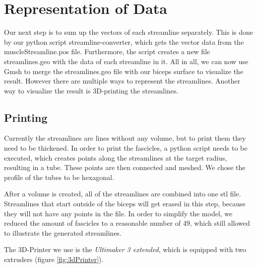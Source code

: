 \documentclass[preprint,journal]{vgtc}       %
\begin{document}
\section{Representation of Data}
Our next step is to sum up the vectors of each streamline separately. 
This is done by our python script streamline-converter, which gets the vector data from the muscleStreamline.pos file. 
Furthermore, the script creates a new file streamlines.geo with the data of each streamline in it. 
All in all, we can now use Gmsh to merge the streamlines.geo file with our biceps surface to visualize the result. 
However there are multiple ways to represent the streamlines. 
Another way to visualize the result is 3D-printing the streamlines.

\subsection{Printing}
Currently the streamlines are lines without any volume, but to print them they need to be thickened. 
In order to print the fascicles, a python script needs to be executed, which creates points along the streamlines at the target radius, resulting in a tube.
These points are then connected and meshed. 
We chose the profile of the tubes to be hexagonal.

After a volume is created, all of the streamlines are combined into one stl file. 
Streamlines that start outside of the biceps will get erased in this step, because they will not have any points in the file. 
In order to simplify the model, we reduced the amount of fascicles to a reasonable number of 49, which still allowed to illustrate the generated streamlines.

The 3D-Printer we use is the \textit{Ultimaker 3 extended}, which is equipped with two extruders (figure \ref{fig:3dPrinter}). 
\end{document}
